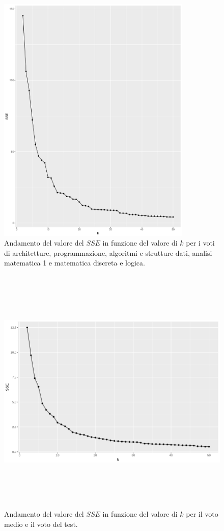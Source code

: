 \documentclass[12pt]{article}
\begin{document}
\begin{figure}[H]
	\centering
	\includegraphics[width=\textwidth, height=12cm,keepaspectratio]{img/k-sse-asd-arc-prg-an1-mdl.pdf}
	\caption{Andamento del valore del $SSE$ in funzione del valore di $k$ per i voti di architetture, programmazione, algoritmi e strutture dati, analisi matematica 1 e matematica discreta e logica.}
	\label{fig:k-sse2}
\end{figure}

\begin{figure}[H]
	\centering
	\includegraphics[width=\textwidth, height=12cm,keepaspectratio]{img/k-sse-voto_medio-test.png}
	\caption{Andamento del valore del $SSE$ in funzione del valore di $k$ per il voto medio e il voto del test.}
	\label{fig:k-sse3}
\end{figure}
\end{document}
